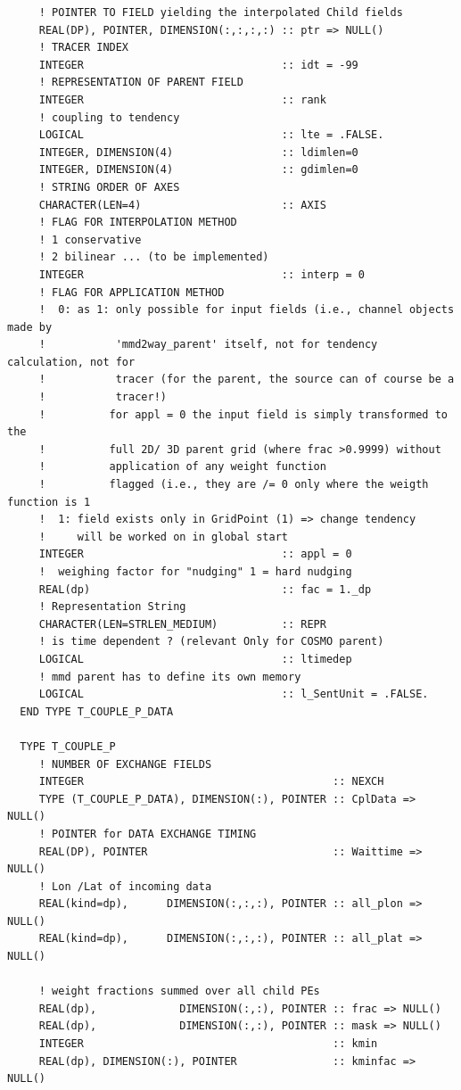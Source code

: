\documentclass[11pt,twoside]{article}
\begin{document}
\begin{verbatim}
     ! POINTER TO FIELD yielding the interpolated Child fields
     REAL(DP), POINTER, DIMENSION(:,:,:,:) :: ptr => NULL()
     ! TRACER INDEX
     INTEGER                               :: idt = -99
     ! REPRESENTATION OF PARENT FIELD
     INTEGER                               :: rank
     ! coupling to tendency
     LOGICAL                               :: lte = .FALSE.
     INTEGER, DIMENSION(4)                 :: ldimlen=0
     INTEGER, DIMENSION(4)                 :: gdimlen=0
     ! STRING ORDER OF AXES
     CHARACTER(LEN=4)                      :: AXIS
     ! FLAG FOR INTERPOLATION METHOD 
     ! 1 conservative
     ! 2 bilinear ... (to be implemented)
     INTEGER                               :: interp = 0
     ! FLAG FOR APPLICATION METHOD 
     !  0: as 1: only possible for input fields (i.e., channel objects made by
     !           'mmd2way_parent' itself, not for tendency calculation, not for
     !           tracer (for the parent, the source can of course be a
     !           tracer!) 
     !          for appl = 0 the input field is simply transformed to the
     !          full 2D/ 3D parent grid (where frac >0.9999) without 
     !          application of any weight function 
     !          flagged (i.e., they are /= 0 only where the weigth function is 1
     !  1: field exists only in GridPoint (1) => change tendency
     !     will be worked on in global start
     INTEGER                               :: appl = 0
     !  weighing factor for "nudging" 1 = hard nudging
     REAL(dp)                              :: fac = 1._dp
     ! Representation String
     CHARACTER(LEN=STRLEN_MEDIUM)          :: REPR
     ! is time dependent ? (relevant Only for COSMO parent)
     LOGICAL                               :: ltimedep
     ! mmd parent has to define its own memory                     
     LOGICAL                               :: l_SentUnit = .FALSE.
  END TYPE T_COUPLE_P_DATA

  TYPE T_COUPLE_P
     ! NUMBER OF EXCHANGE FIELDS 
     INTEGER                                       :: NEXCH
     TYPE (T_COUPLE_P_DATA), DIMENSION(:), POINTER :: CplData => NULL()
     ! POINTER for DATA EXCHANGE TIMING
     REAL(DP), POINTER                             :: Waittime => NULL()
     ! Lon /Lat of incoming data
     REAL(kind=dp),      DIMENSION(:,:,:), POINTER :: all_plon => NULL()
     REAL(kind=dp),      DIMENSION(:,:,:), POINTER :: all_plat => NULL()

     ! weight fractions summed over all child PEs
     REAL(dp),             DIMENSION(:,:), POINTER :: frac => NULL()
     REAL(dp),             DIMENSION(:,:), POINTER :: mask => NULL()
     INTEGER                                       :: kmin    
     REAL(dp), DIMENSION(:), POINTER               :: kminfac => NULL()


\end{verbatim}
\end{document}
